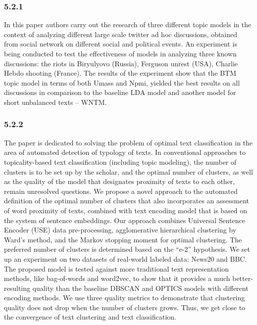 \subsubsection{5.2.1}

In this paper authors carry out the research of three different topic models in the context of analyzing different large scale twitter ad hoc discussions, obtained from social network on different social and political events. An experiment is being conducted to test the effectiveness of models in analyzing three known discussions: the riots in Biryulyovo (Russia), Ferguson unrest (USA), Charlie Hebdo shooting (France). The results of the experiment show that the BTM topic model in terms of both Umass and Npmi, yielded the best results on all discussions in comparison to the baseline LDA model and another model for short unbalanced texts -- WNTM.

\subsubsection{5.2.2}

The paper is dedicated to solving the problem of optimal text classification in the area of automated detection of typology of texts. In conventional approaches to topicality-based text classification (including topic modeling), the number of clusters is to be set up by the scholar, and the optimal number of clusters, as well as the quality of the model that designates proximity of texts to each other, remain unresolved questions. We propose a novel approach to the automated definition of the optimal number of clusters that also incorporates an assessment of word proximity of texts, combined with text encoding model that is based on the system of sentence embeddings. Our approach combines Universal Sentence Encoder (USE) data pre-processing, agglomerative hierarchical clustering by Ward’s method, and the Markov stopping moment for optimal clustering. The preferred number of clusters is determined based on the “e-2” hypothesis. We set up an experiment on two datasets of real-world labeled data: News20 and BBC. The proposed model is tested against more traditional text representation methods, like bag-of-words and word2vec, to show that it provides a much better-resulting quality than the baseline DBSCAN and OPTICS models with different encoding methods. We use three quality metrics to demonstrate that clustering quality does not drop when the number of clusters grows. Thus, we get close to the convergence of text clustering and text classification.

